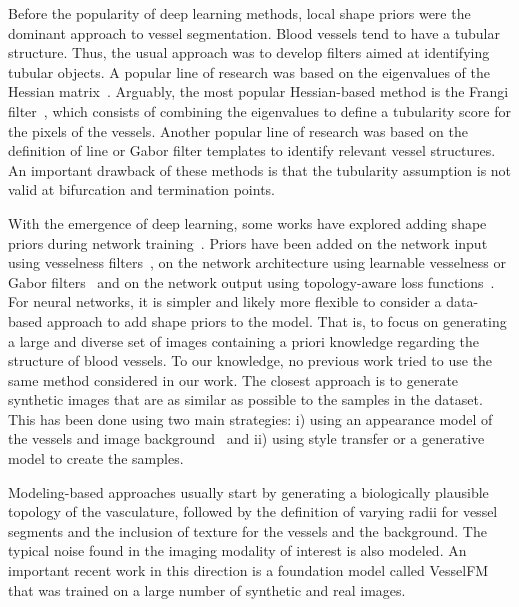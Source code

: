 \documentclass[%
reprint,
nofootinbib,
 amsmath,amssymb,
aps,
superscriptaddress,
showkeys,
longbibliography
]{revtex4-1}
\begin{document}
Before the popularity of deep learning methods, local shape priors were the dominant approach to vessel segmentation. Blood vessels tend to have a tubular structure. Thus, the usual approach was to develop filters aimed at identifying tubular objects. A popular line of research was based on the eigenvalues of the Hessian matrix~\cite{fraz2012blood,sato1998three}. Arguably, the most popular Hessian-based method is the Frangi filter~\cite{frangi1998multiscale}, which consists of combining the eigenvalues to define a tubularity score for the pixels of the vessels. Another popular line of research was based on the definition of line or Gabor filter templates to identify relevant vessel structures. An important drawback of these methods is that the tubularity assumption is not valid at bifurcation and termination points.

With the emergence of deep learning, some works have explored adding shape priors during network training~\cite{bohlender2021survey}. Priors have been added on the network input using vesselness filters~\cite{affane2022robust,hu2024domain,garret2024deep}, on the network architecture using learnable vesselness or Gabor filters~\cite{chen2023learnable,fu2018frangi,volkov2025modification} and on the network output using topology-aware loss functions~\cite{shit2021cldice,hu2019topology,berger2024topologically}. For neural networks, it is simpler and likely more flexible to consider a data-based approach to add shape priors to the model. That is, to focus on generating a large and diverse set of images containing a priori knowledge regarding the structure of blood vessels. To our knowledge, no previous work tried to use the same method considered in our work. The closest approach is to generate synthetic images that are as similar as possible to the samples in the dataset. This has been done using two main strategies: i) using an appearance model of the vessels and image background~\cite{tetteh2020deepvesselnet,wittmann2025vesselfm,wittmann2024simulation,mathys2025synthetic} and ii) using style transfer or a generative model to create the samples. 

Modeling-based approaches usually start by generating a biologically plausible topology of the vasculature, followed by the definition of varying radii for vessel segments and the inclusion of texture for the vessels and the background. The typical noise found in the imaging modality of interest is also modeled. An important recent work in this direction is a foundation model called VesselFM~\cite{wittmann2025vesselfm} that was trained on a large number of synthetic and real images.
\end{document}
